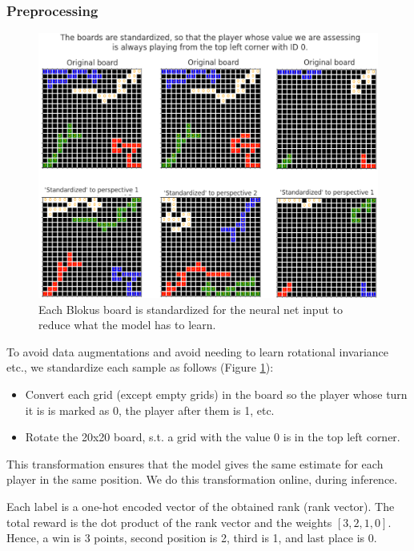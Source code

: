 \documentclass{article}
\begin{document}
\subsubsection{Preprocessing}
\begin{figure}
    \centering
    \includegraphics[width=1\linewidth]{blokus_std_boards_edited.png}
    \caption{Each Blokus board is standardized for the neural
    net input to reduce what the model has to learn.}
    \label{fig:blokus-board-std}
\end{figure}

To avoid data augmentations and avoid needing to learn
rotational invariance etc., we standardize each sample
as follows (Figure \ref{fig:blokus-board-std}):
\begin{itemize}
    \item Convert each grid (except empty grids) in the
    board so the player whose turn it is is marked as 0,
    the player after them is 1, etc.
    \item Rotate the 20x20 board, s.t. a grid with the
    value 0 is in the top left corner.
\end{itemize}
This transformation ensures that the model gives the same
estimate for each player in the same position. We do this
transformation online, during inference.

Each label is a one-hot encoded vector of the obtained rank
(rank vector). The total reward is the dot product of the
rank vector and the weights $[3,2,1,0]$. Hence, a win is
3 points, second position is 2, third is 1, and last place is 0.
\end{document}
